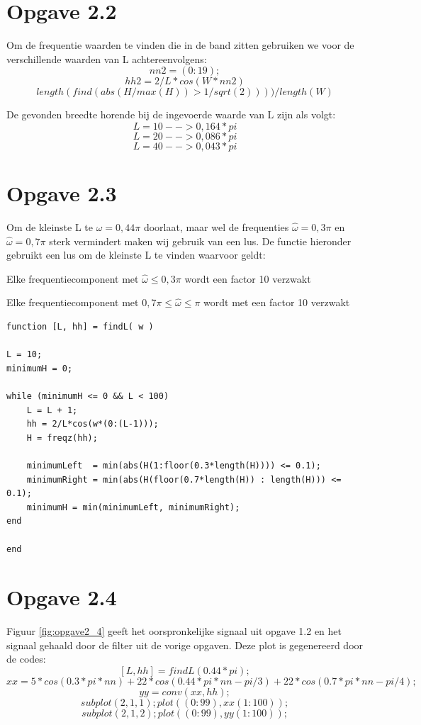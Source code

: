 \documentclass{article}
\begin{document}
\section{Opgave 2.2}

Om de frequentie waarden te vinden die in de band zitten gebruiken we voor de verschillende waarden van L achtereenvolgens:
$$nn2 = (0:19);$$
$$hh2 = 2/L* cos(W*nn2)$$
$$length(find(abs(H/max(H)) > 1/sqrt(2)))) / length(W)$$

De gevonden breedte horende bij de ingevoerde waarde van L zijn als volgt:
$$L=10 --> 0,164*pi$$
$$L=20 --> 0,086*pi$$
$$L=40 --> 0,043*pi$$


\section{Opgave 2.3}
Om de kleinste L te $\hat{\omega} = 0,44\pi$ doorlaat, maar wel de frequenties $\hat{\omega} = 0,3\pi$ en $\hat{\omega} = 0,7\pi$ sterk vermindert maken wij gebruik van een lus. De functie hieronder gebruikt een lus om de kleinste L te vinden waarvoor geldt:

\begin{list}{}{}
 \item Elke frequentiecomponent met $\hat{\omega} \leq 0,3 \pi$ wordt een factor 10 verzwakt
 \item Elke frequentiecomponent met $0,7 \pi \leq \hat{\omega} \leq \pi$ wordt met een factor 10 verzwakt
\end{list}


\begin{lstlisting}
function [L, hh] = findL( w )

L = 10;
minimumH = 0;

while (minimumH <= 0 && L < 100)
    L = L + 1;
    hh = 2/L*cos(w*(0:(L-1))); 
    H = freqz(hh);
    
    minimumLeft  = min(abs(H(1:floor(0.3*length(H)))) <= 0.1);
    minimumRight = min(abs(H(floor(0.7*length(H)) : length(H))) <= 0.1);
    minimumH = min(minimumLeft, minimumRight);
end

end
\end{lstlisting}

\section{Opgave 2.4}

Figuur \ref{fig:opgave2_4} geeft het oorspronkelijke signaal uit opgave 1.2 en het signaal gehaald door de filter uit de vorige opgaven. Deze plot is gegenereerd door de codes:
$$[L, hh] = findL(0.44*pi);$$
$$xx = 5*cos(0.3*pi*nn) + 22 * cos(0.44*pi*nn - pi/3) + 22 * cos (0.7*pi*nn - pi/4);$$
$$yy = conv(xx, hh);$$
$$subplot(2,1,1); plot((0:99), xx(1:100));$$
$$subplot(2,1,2); plot((0:99), yy(1:100));$$
\end{document}
